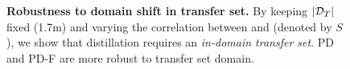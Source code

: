 \begin{figure}[t]
\begin{minipage}[t]{0.48\textwidth}
{
    } %
    \caption{\small {\bf Robustness to domain shift in transfer set.} By keeping $|\mathcal{D}_T|$ fixed (1.7m) and varying the correlation between \DL and \DT (denoted by $S$), we show that distillation requires an \emph{in-domain transfer set}. PD and PD-F are more robust to transfer set domain.}
    \label{fig:2b-domain-shift}
    \end{minipage}
    \vspace{-10pt}
\end{figure}